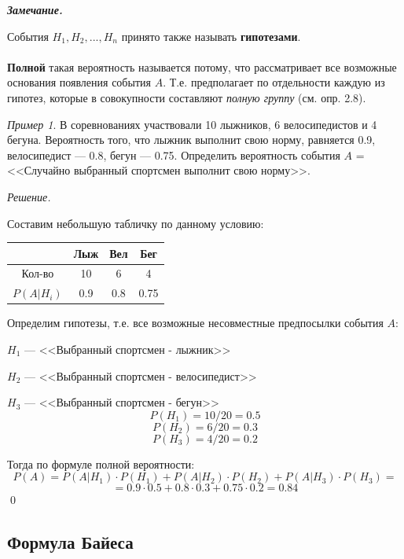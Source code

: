 \documentclass[12pt,a4paper]{article}
\theoremstyle{definition}
\theoremstyle{definition}
\theoremstyle{remark}
\newenvironment{remark}{
  \par\noindent\textbf{\textit{Замечание.}}~
}{\par}
\theoremstyle{corollary}
\theoremstyle{bolditalic}
\newtheorem{example}{Пример}[section]
\newenvironment{solution}{
    \vspace{0.5em}
    \noindent\textit{Решение.}
}{\qed\vspace{1em}}
\begin{document}
\begin{remark}
    События $H_1, H_2, ..., H_n$ принято также называть \textbf{гипотезами}.\\\\
\textbf{Полной} такая вероятность называется потому, что рассматривает все возможные основания появления события $A$. Т.е. предполагает по отдельности каждую из гипотез, которые в совокупности составляют \textit{полную группу} (см. опр. 2.8).
\end{remark}

\begin{example}
    В соревнованиях участвовали 10 лыжников, 6 велосипедистов и 4 бегуна. Вероятность того, что лыжник выполнит свою норму, равняется 0.9, велосипедист --- 0.8, бегун --- 0.75. Определить вероятность события $A$ = <<Случайно выбранный спортсмен выполнит свою норму>>.
\end{example}

\begin{solution}
    Составим небольшую табличку по данному условию:
\begin{table}[h]
    \centering
    \begin{tabular}{|c|c|c|c|}
    \hline
     & \textbf{Лыж} & \textbf{Вел} & \textbf{Бег} \\
    \hline
    Кол-во & 10 & 6 & 4 \\
    \hline
    $P(A|H_i)$ & 0.9 & 0.8 & 0.75 \\
    \hline
    \end{tabular}
\end{table}

    Определим гипотезы, т.е. все возможные несовместные предпосылки события $A$:
    \vspace{1em}
    
    $H_1$ --- <<Выбранный спортсмен - лыжник>>
    
    $H_2$ --- <<Выбранный спортсмен - велосипедист>>
    
    $H_3$ --- <<Выбранный спортсмен - бегун>>\\
    \[
    P(H_1)=10/20=0.5
    \]
    \[
    P(H_2)=6/20=0.3
    \]
    \[
    P(H_3)=4/20=0.2
    \]

    Тогда по формуле полной вероятности:
    \[
    P(A) = P(A|H_1)\cdot P(H_1)+P(A|H_2)\cdot P(H_2)+P(A|H_3)\cdot P(H_3)=
    \]
    \[
    = 0.9\cdot 0.5 + 0.8\cdot 0.3 + 0.75\cdot 0.2=0.84
    \]
\end{solution}

\subsection{Формула Байеса}
\end{document}
